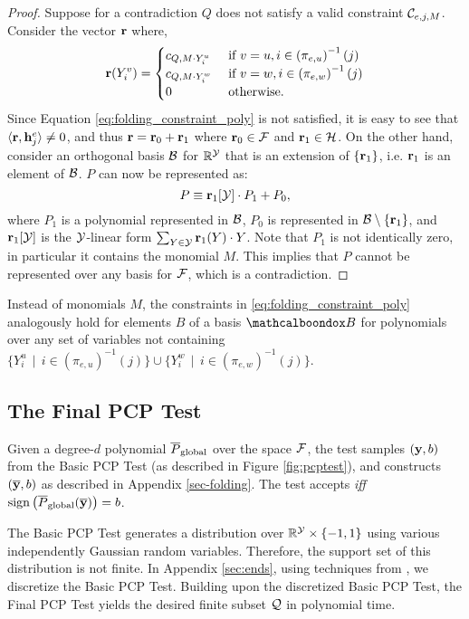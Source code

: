 \begin{proof}
Suppose for a contradiction $Q$ does not satisfy a valid constraint $\mathcal{C}_{e, j, M}$. Consider the vector ${\bf r}$ where,
$${\bf r}(Y^v_i) = \begin{cases}
c_{Q,M\cdot Y^u_i} & \tn{ if } v=u, i \in \left(\pi_{e,u}\right)^{-1}(j)\\
c_{Q,M\cdot Y^w_i} & \tn{ if } v=w, i \in \left(\pi_{e,w}\right)^{-1}(j)\\
0 & \tn{ otherwise.}
\end{cases}$$
Since Equation \eqref{eq:folding_constraint_poly} is not satisfied, it is easy to see that $\langle {\bf r}, {\bf h}^e_j\rangle \neq 0$, and thus ${\bf r} = {\bf r}_0 + {\bf r}_1$ where  ${\bf r}_0 \in \mc{F}$ and ${\bf r}_1 \in \mc{H}$. On the other hand, consider an orthogonal basis $\mathcal{B}$ for $\mathbb{R}^{\mathcal{Y}}$ that is an extension of $\{{\bf r}_1\}$, i.e. ${\bf r}_1$ is an element of $\mathcal{B}$. $P$ can now be represented as:
$$P \equiv  {\bf r}_1[\mc{Y}]\cdot P_1 + P_0,$$
where $P_1$ is a polynomial represented in $\mathcal{B}$, $P_0$ is represented in $\mc{B}\setminus\{{\bf r}_1\}$, and ${\bf r}_1[\mc{Y}]$ is the $\mathcal{Y}$-linear form $\sum_{Y \in \mc{Y}} {\bf r}_1(Y)\cdot Y$. Note that $P_1$ is not identically zero, in particular it contains the monomial $M$.
This implies that $P$ cannot be represented over any basis for $\mathcal{F}$, which is a contradiction.  
\end{proof}
\begin{remark}\label{rem-folding-poly}
Instead of monomials $M$, the constraints in \eqref{eq:folding_constraint_poly} analogously hold for elements $B$ of a basis $\mcb{B}$ for polynomials over any set of variables not containing $\{Y^u_i\, \mid\, i\in \left(\pi_{e,u}\right)^{-1}(j)\}\cup \{Y^w_i\, \mid\, i\in \left(\pi_{e,w}\right)^{-1}(j)\}$.
\end{remark}


  

\subsection{ The Final PCP Test}\label{sec-final-pcp-test}
Given a degree-$d$ polynomial $\overline{P}_{\textnormal{global}}$ over the space $\mathcal{F}$, the test samples $({\bf y},b)$ from the Basic PCP Test (as described in Figure \ref{fig:pcptest}), and constructs $(\ol{\bf y},b)$ as described in Appendix \ref{sec-folding}. The test accepts {\it iff} ${\rm sign}\left(\ol{P}_{\tn{global}}(\ol{\bf y})\right)=b$.

		
\begin{remark}The Basic PCP Test generates a distribution over $\mathbb{R}^{\mathcal{Y}}\times \{-1,1\}$ using
various independently Gaussian random variables. Therefore, the support set of this distribution is not finite. In Appendix \ref{sec:ends}, using techniques from \cite{DOSW11}, we discretize the Basic PCP Test. 
Building upon the discretized Basic PCP Test, the Final PCP Test yields the desired finite subset $\mathcal{Q}$ in polynomial time. 
\end{remark}






